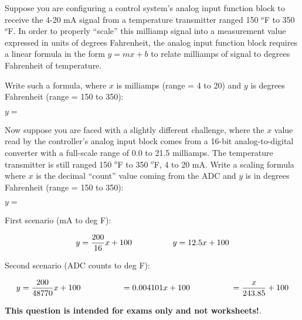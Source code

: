 

Suppose you are configuring a control system's analog input function block to receive the 4-20 mA signal from a temperature transmitter ranged 150 $^{o}$F to 350 $^{o}$F.  In order to properly ``scale'' this milliamp signal into a measurement value expressed in units of degrees Fahrenheit, the analog input function block requires a linear formula in the form $y = mx + b$ to relate milliamps of signal to degrees Fahrenheit of temperature.

\vskip 10pt

Write such a formula, where $x$ is milliamps (range = 4 to 20) and $y$ is degrees Fahrenheit (range = 150 to 350):

\vskip 10pt

$y =$

\vskip 20pt

Now suppose you are faced with a slightly different challenge, where the $x$ value read by the controller's analog input block comes from a 16-bit analog-to-digital converter with a full-scale range of 0.0 to 21.5 milliamps.  The temperature transmitter is still ranged 150 $^{o}$F to 350 $^{o}$F, 4 to 20 mA.  Write a scaling formula where $x$ is the decimal ``count'' value coming from the ADC and $y$ is in degrees Fahrenheit (range = 150 to 350):

\vskip 10pt

$y =$







First scenario (mA to deg F):

$$y = {200 \over 16}x + 100 \hskip 50pt y = 12.5x + 100$$

\vskip 10pt

Second scenario (ADC counts to deg F):

$$y = {200 \over 48770}x + 100 \hskip 50pt = 0.004101x + 100 \hskip 50pt = {x \over 243.85} + 100$$







{\bf This question is intended for exams only and not worksheets!}.



